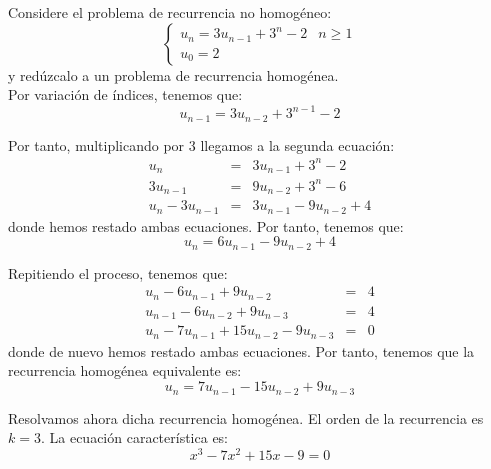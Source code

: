 \begin{ejercicio}
    Considere el problema de recurrencia no homogéneo:
    \begin{equation*}
        \left\{\begin{array}{ll}
            u_n = 3u_{n-1} +3^n-2 & n\geq 1 \\
            u_0 = 2
        \end{array}\right.
    \end{equation*}
    y redúzcalo a un problema de recurrencia homogénea.\\

    Por variación de índices, tenemos que:
    \begin{equation*}
        u_{n-1} = 3u_{n-2} + 3^{n-1}-2
    \end{equation*}

    Por tanto, multiplicando por $3$ llegamos a la segunda ecuación:
    \begin{equation*}
        \begin{array}{rcl}
            u_n &=& 3u_{n-1} + 3^n - 2 \\
            3u_{n-1} &=& 9u_{n-2} + 3^n - 6 \\ \hline
            u_n - 3u_{n-1} &=& 3u_{n-1} - 9u_{n-2} + 4
        \end{array}
    \end{equation*}
    donde hemos restado ambas ecuaciones. Por tanto, tenemos que:
    \begin{equation*}
        u_n = 6u_{n-1} - 9u_{n-2} + 4
    \end{equation*}

    Repitiendo el proceso, tenemos que:
    \begin{equation*}
        \begin{array}{rcl}
            u_n - 6u_{n-1} + 9u_{n-2} &=& 4 \\
            u_{n-1} - 6u_{n-2} + 9u_{n-3} &=& 4 \\ \hline
            u_n - 7u_{n-1} + 15u_{n-2} - 9u_{n-3} &=& 0
        \end{array}
    \end{equation*}
    donde de nuevo hemos restado ambas ecuaciones. Por tanto, tenemos que la recurrencia homogénea equivalente es:
    \begin{equation*}
        u_n = 7u_{n-1} - 15u_{n-2} + 9u_{n-3}
    \end{equation*}

    Resolvamos ahora dicha recurrencia homogénea. El orden de la recurrencia es $k=3$. La ecuación característica es:
    \begin{equation*}
        x^3 - 7x^2 + 15x - 9 = 0
    \end{equation*}


\end{ejercicio}
